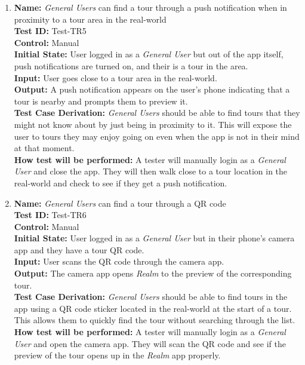 \documentclass[12pt, titlepage]{article}
\begin{document}
\begin{enumerate}
  \item
        \textbf{Name:} \textit{General Users} can find a tour through a push notification when in proximity to a tour area in the real-world \label{itm:Test-TR5} \\
        \textbf{Test ID:} Test-TR5 \\
        \textbf{Control:} Manual \\
        \textbf{Initial State:} User logged in as a \textit{General User} but out of the app itself, push notifications are turned on, and their is a tour in the area. \\
        \textbf{Input:} User goes close to a tour area in the real-world. \\
        \textbf{Output:} A push notification appears on the user's phone indicating that a tour is nearby and prompts them to preview it. \\
        \textbf{Test Case Derivation:} \textit{General Users} should be able to find tours that they might not know about by just being in proximity to it. This will expose the user to tours they may enjoy going on even when the app is not in their mind at that moment. \\
        \textbf{How test will be performed:} A tester will manually login as a \textit{General User} and close the app. They will then walk close to a tour location in the real-world and check to see if they get a push notification.

  \item
        \textbf{Name:} \textit{General Users} can find a tour through a QR code \label{itm:Test-TR6} \\
        \textbf{Test ID:} Test-TR6 \\
        \textbf{Control:} Manual \\
        \textbf{Initial State:} User logged in as a \textit{General User} but in their phone's camera app and they have a tour QR code. \\
        \textbf{Input:} User scans the QR code through the camera app. \\
        \textbf{Output:} The camera app opens \textit{Realm} to the preview of the corresponding tour. \\
        \textbf{Test Case Derivation:} \textit{General Users} should be able to find tours in the app using a QR code sticker located in the real-world at the start of a tour. This allows them to quickly find the tour without searching through the list. \\
        \textbf{How test will be performed:} A tester will manually login as a \textit{General User} and open the camera app. They will scan the QR code and see if the preview of the tour opens up in the \textit{Realm} app properly.


\end{enumerate}
\end{document}

